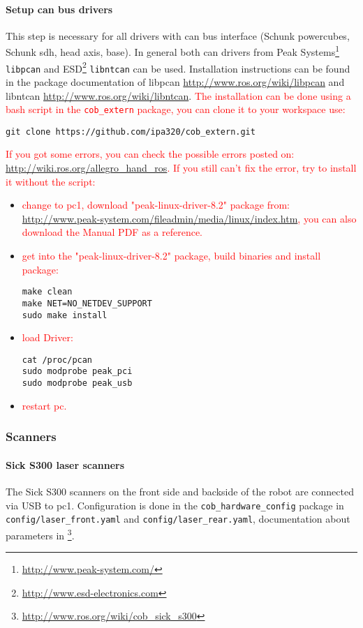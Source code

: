 \paragraph{Setup can bus drivers}
This step is necessary for all drivers with can bus interface (Schunk powercubes, Schunk sdh, head axis, base). In general both can drivers from Peak Systems\footnote{\url{http://www.peak-system.com/}} \texttt{libpcan} and ESD\footnote{\url{http://www.esd-electronics.com}} \texttt{libntcan} can be used. Installation instructions can be found in the package documentation of libpcan \url{http://www.ros.org/wiki/libpcan} and libntcan \url{http://www.ros.org/wiki/libntcan}.\newline
\textcolor{red}{The installation can be done using a bash script in the \texttt{cob\_extern} package, you can clone it to your workspace use:} \begin{lstlisting}
git clone https://github.com/ipa320/cob_extern.git
\end{lstlisting} 

\textcolor{red}{If you got some errors, you can check the possible errors posted on: \url{http://wiki.ros.org/allegro_hand_ros}.}
\textcolor{red}{If you still can't fix the error, try to install it without the script: }
\begin{itemize}
\item \textcolor{red}{change to pc1, download "peak-linux-driver-8.2" package from: \url{http://www.peak-system.com/fileadmin/media/linux/index.htm}, you can also download the Manual PDF as a reference.}
\item \textcolor{red}{get into the "peak-linux-driver-8.2" package, build binaries and install package:}
\begin{lstlisting}
make clean
make NET=NO_NETDEV_SUPPORT
sudo make install
\end{lstlisting} 
\item \textcolor{red}{load Driver:}
\begin{lstlisting}
cat /proc/pcan
sudo modprobe peak_pci
sudo modprobe peak_usb
\end{lstlisting} 
\item \textcolor{red}{restart pc.}
\end{itemize}


\subsubsection{Scanners}

\paragraph{Sick S300 laser scanners}
The Sick S300 scanners on the front side and backside of the robot are connected via USB to pc1. Configuration is done in the \texttt{cob\_hardware\_config} package in \texttt{config/laser\_front.yaml} and \texttt{config/laser\_rear.yaml}, documentation about parameters in \footnote{\url{http://www.ros.org/wiki/cob_sick_s300}}.

